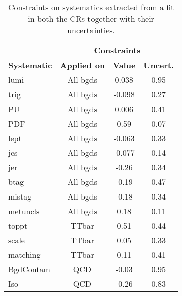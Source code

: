 \documentclass[10pt]{article}
\begin{document}
\begin{table}[!ht]
\begin{center}
\begin{tabular}{|l|c|c|c|}
\hline
\hline
& \multicolumn{3}{c|}{\textbf{Constraints}} \\
\hline
\hline
\textbf{Systematic} & \textbf{Applied on} & \textbf{Value} & \textbf{Uncert.}\\
\hline
lumi            & All bgds  & 0.038   & 0.95   \\
trig            & All bgds  & -0.098  & 0.27   \\
PU              & All bgds  & 0.006   & 0.41   \\
PDF             & All bgds  & 0.59    & 0.07   \\
lept            & All bgds  & -0.063  & 0.33   \\
jes             & All bgds  & -0.077  & 0.14   \\
jer             & All bgds  & -0.26   & 0.34   \\
btag            & All bgds  & -0.19   & 0.47   \\
mistag          & All bgds  & -0.18   & 0.34   \\
metuncls        & All bgds  & 0.18    & 0.11   \\
toppt           & TTbar     & 0.51    & 0.44   \\
scale           & TTbar     & 0.05    & 0.33   \\
matching        & TTbar     &  0.11   & 0.41   \\
BgdContam       & QCD       & -0.03   & 0.95   \\
Iso             & QCD       & -0.26   & 0.83   \\
\hline
\hline

\hline
\hline
\end{tabular}
\caption{Constraints on systematics extracted from a fit in both the CRs together with their uncertainties.}
\label{tab:SFtable}
\end{center}
\end{table} 
\end{document}

